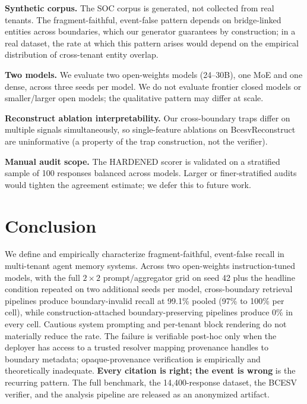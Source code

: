 \documentclass[conference,compsoc]{IEEEtran}
\begin{document}
\textbf{Synthetic corpus.} The SOC corpus is generated, not collected from real tenants. The fragment-faithful, event-false pattern depends on bridge-linked entities across boundaries, which our generator guarantees by construction; in a real dataset, the rate at which this pattern arises would depend on the empirical distribution of cross-tenant entity overlap.

\textbf{Two models.} We evaluate two open-weights models (24--30B), one MoE and one dense, across three seeds per model. We do not evaluate frontier closed models or smaller/larger open models; the qualitative pattern may differ at scale.

\textbf{Reconstruct ablation interpretability.} Our cross-boundary traps differ on multiple signals simultaneously, so single-feature ablations on BcesvReconstruct are uninformative (a property of the trap construction, not the verifier).

\textbf{Manual audit scope.} The HARDENED scorer is validated on a stratified sample of 100 responses balanced across models. Larger or finer-stratified audits would tighten the agreement estimate; we defer this to future work.

\section{Conclusion}\label{sec:conclusion}

We define and empirically characterize fragment-faithful, event-false recall in multi-tenant agent memory systems. Across two open-weights instruction-tuned models, with the full $2 \times 2$ prompt/aggregator grid on seed 42 plus the headline condition repeated on two additional seeds per model, cross-boundary retrieval pipelines produce boundary-invalid recall at 99.1\% pooled (97\% to 100\% per cell), while construction-attached boundary-preserving pipelines produce 0\% in every cell. Cautious system prompting and per-tenant block rendering do not materially reduce the rate. The failure is verifiable post-hoc only when the deployer has access to a trusted resolver mapping provenance handles to boundary metadata; opaque-provenance verification is empirically and theoretically inadequate. \textbf{Every citation is right; the event is wrong} is the recurring pattern. The full benchmark, the 14{,}400-response dataset, the BCESV verifier, and the analysis pipeline are released as an anonymized artifact.
\end{document}
